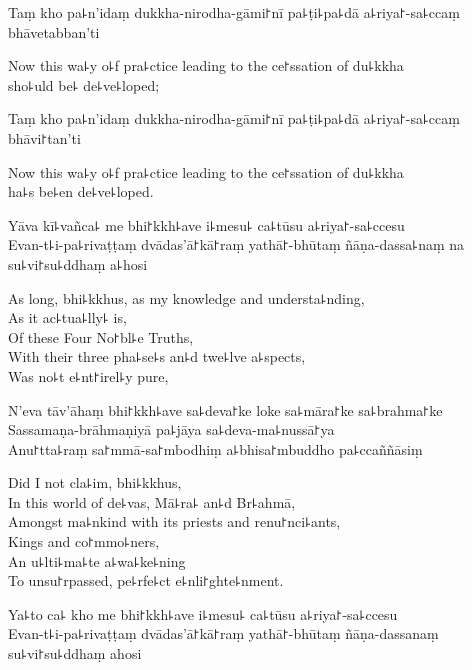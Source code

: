 Taṃ kho pa꜕n'idaṃ dukkha-nirodha-gāmi꜓nī pa꜕ṭi꜕pa꜕dā a꜕riya꜓-sa꜕ccaṃ bhāvetabban'ti

\begin{english}
  Now this wa꜕y o꜕f pra꜕ctice leading to the ce꜓ssation of du꜕kkha\\
  sho꜕uld be꜕ de꜕ve꜕loped;
\end{english}

Taṃ kho pa꜕n'idaṃ dukkha-nirodha-gāmi꜓nī pa꜕ṭi꜕pa꜕dā a꜕riya꜓-sa꜕ccaṃ bhāvi꜓tan'ti

\begin{english}
  Now this wa꜕y o꜕f pra꜕ctice leading to the ce꜓ssation of du꜕kkha\\
  ha꜕s be꜕en de꜕ve꜕loped.
\end{english}

Yāva kī꜕vañca꜕ me bhi꜓kkh꜕ave i꜕mesu꜕ ca꜕tūsu a꜕riya꜓-sa꜕ccesu\\
Evan-t꜕i-pa꜕rivaṭṭaṃ dvādas'ā꜓kā꜓raṃ yathā꜓-bhūtaṃ ñāṇa-dassa꜕naṃ na su꜕vi꜓su꜕ddhaṃ a꜕hosi

\ifaivedition\relax\else
\clearpage
\fi

\begin{english}
  As long, bhi꜕kkhus, as my knowledge and understa꜕nding,\\
  As it ac꜕tua꜕lly꜕ is,\\
  Of these Four No꜓bl꜕e Truths,\\
  With their three pha꜕se꜕s an꜕d twe꜕lve a꜕spects,\\
  Was no꜕t e꜕nt꜓irel꜕y pure,
\end{english}

N'eva tāv'āhaṃ bhi꜓kkh꜕ave sa꜕deva꜓ke loke sa꜕māra꜓ke sa꜕brahma꜓ke\\
Sassamaṇa-brāhmaṇiyā pa꜕jāya sa꜕deva-ma꜕nussā꜓ya\\
Anu꜓tta꜕raṃ sa꜓mmā-sa꜓mbodhiṃ a꜕bhisa꜓mbuddho pa꜕ccaññāsiṃ

\begin{english}
  Did I not cla꜕im, bhi꜕kkhus,\\
  In this world of de꜕vas, Mā꜕ra꜕ an꜕d Br꜕ahmā,\\
  \ifaivedition
  \clearpage
  \fi
  Amongst ma꜕nkind with its priests and renu꜓nci꜕ants,\\
  Kings and co꜓mmo꜕ners,\\
  An u꜕lti꜕ma꜕te a꜕wa꜕ke꜕ning\\
  To unsu꜓rpassed, pe꜕rfe꜕ct e꜕nli꜓ghte꜕nment.
\end{english}

Ya꜕to ca꜕ kho me bhi꜓kkh꜕ave i꜕mesu꜕ ca꜕tūsu a꜕riya꜓-sa꜕ccesu\\
Evan-t꜕i-pa꜕rivaṭṭaṃ dvādas'ā꜓kā꜓raṃ yathā꜓-bhūtaṃ ñāṇa-dassanaṃ su꜕vi꜓su꜕ddhaṃ ahosi

